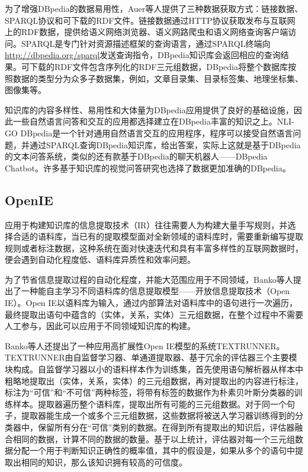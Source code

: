 为了增强DBpedia的数据易用性，Auer等人提供了三种数据获取方式：链接数据、SPARQL协议和可下载的RDF文件。链接数据通过HTTP协议获取发布与互联网上的RDF数据，提供给语义网络浏览器、语义网路爬虫和语义网络查询客户端访问。SPARQL是专门针对资源描述框架的查询语言，通过SPARQL终端向\url{http://dbpedia.org/sparql}发送查询指令，DBpedia知识库会返回相应的查询结果。可下载的RDF文件包含序列化的RDF三元组数据，DBpedia将整个数据库按照数据的类型分为众多子数据集，例如，文章目录集、目录标签集、地理坐标集、图像集等。

知识库的内容多样性、易用性和大体量为DBpedia应用提供了良好的基础设施，因此一些自然语言问答和交互的应用都选择建立在DBpedia丰富的知识之上。NLI-GO DBpedia是一个针对通用自然语言交互的应用程序，程序可以接受自然语言问题，并通过SPARQL查询DBpedia知识库，给出答案，实际上这就是基于DBpedia的文本问答系统，类似的还有款基于DBpedia的聊天机器人——DBpedia Chatbot。许多基于知识库的视觉问答研究也选择了数据更加准确的DBpedia。

\subsection{OpenIE}
应用于构建知识库的信息提取技术（IR）往往需要人为构建大量手写规则，并选择合适的语料库，当已有的提取模型面对全新领域的语料库时，需要重新编写提取规则或者标注数据，这种系统在面对快速迭代和具有丰富多样性的互联网数据时，便会遇到自动化程度低、语料库异质性和效率问题。

为了节省信息提取过程的自动化程度，并能大范围应用于不同领域，Banko等人提出了一种能自主学习不同语料库的信息提取模型——开放信息提取技术（Open IE）。Open IE以语料库为输入，通过内部算法对语料库中的语句进行一次遍历，最终提取出语句中蕴含的（实体，关系，实体）三元组数据，在整个过程中不需要人工参与，因此可以应用于不同领域知识库的构建。

Banko等人还提出了一种应用高扩展性Open IE模型的系统TEXTRUNNER。TEXTRUNNER由自监督学习器、单通道提取器、基于冗余的评估器三个主要模块构成。自监督学习器以小的语料样本作为训练集，首先使用语句解析器从样本中粗略地提取出（实体，关系，实体）的三元组数据，再对提取出的内容进行标注，标注为“可信”和“不可信”两种标签，将带有标签的数据作为朴素贝叶斯分类器的训练样本。提取器遍历整个语料库，提取出所有可能的三元组数据。对于同一个句子，提取器能生成一个或多个三元组数据，这些数据将被送入学习器训练得到的分类器中，保留所有分在“可信”类别的数据。在得到所有提取出的知识后，评估器融合相同的数据，计算不同的数据的数量。基于以上统计，评估器对每一个三元组数据分配一个用于判断知识正确性的概率值，其中的假设是，如果从多个的语句中提取出相同的知识，那么该知识拥有较高的可信度。


